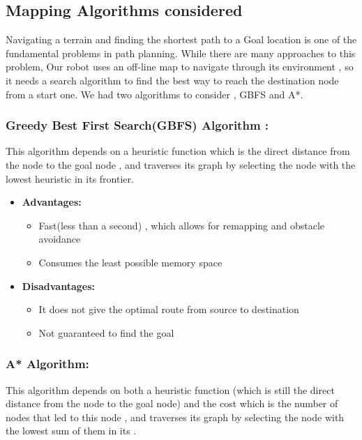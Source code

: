\documentclass[12pt]{article}
\begin{document}
\subsection{Mapping Algorithms considered}
Navigating a terrain and finding the shortest path to a Goal location is one of the fundamental problems in path planning. While there are many approaches to this problem, Our robot uses an off-line map to navigate through its environment , so it needs a search algorithm to find the best way to reach the destination node from a start one. We had two algorithms to consider , GBFS and A*.

\subsubsection{Greedy Best First Search(GBFS) Algorithm :}
This algorithm depends on a heuristic function which is the direct distance from the node to the goal node , and traverses its graph by selecting the node with the lowest heuristic in its frontier.

\begin{itemize}
	\item \textbf{Advantages:}
		\begin{itemize}
			\item Fast(less than a second) , which allows for remapping and obstacle avoidance
			\item Consumes the least possible memory space
			
		\end{itemize}
	\item \textbf{Disadvantages:}
		\begin{itemize}
			\item It does not give the optimal route from source to destination
			\item Not guaranteed to find the goal
			
		\end{itemize}
\end{itemize}

\subsubsection{A* Algorithm:}
This algorithm depends on both a heuristic function (which is still the direct distance from the node to the goal node) and the cost which is the number of nodes that led to this node , and traverses its graph by selecting the node with the lowest sum of them in its .
\end{document}
